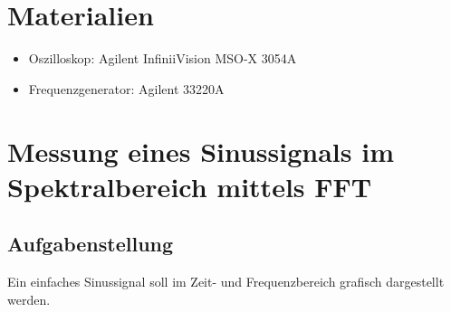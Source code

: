 \documentclass[12pt,a4paper,titlepage]{article}
\begin{document}
\setcounter{page}{2}

\newpage
\setcounter{tocdepth}{1}
\tableofcontents

\newpage

\section*{Materialien}
\begin{itemize}
	\item Oszilloskop: Agilent InfiniiVision MSO-X 3054A
	\item Frequenzgenerator: Agilent 33220A
\end{itemize}

\section{Messung eines Sinussignals im Spektralbereich mittels FFT}

%
%
%

\subsection*{Aufgabenstellung}
Ein einfaches Sinussignal soll im Zeit- und Frequenzbereich grafisch dargestellt werden.
\end{document}

